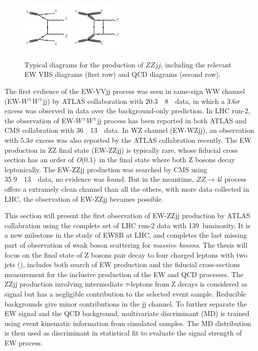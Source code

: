 \begin{figure}[!htbp]
\begin{center}
\includegraphics[width=0.22\textwidth]{figures/VBSZZ/diagram-QCDZZjj-gg.pdf}
\includegraphics[width=0.22\textwidth]{figures/VBSZZ/diagram-QCDZZjj-box.pdf}\\
\end{center}
\caption{Typical diagrams for the production of $ZZjj$, including the relevant EW VBS diagrams (first row) and QCD diagrams (second row).}
\label{fig:vbszz_diagrams}
\end{figure}

The first evdience of the EW-VVjj process was seen in same-sign WW channel (EW-$W^{\pm}W^{\pm}$jj) by ATLAS collaboration with 20.3~\ifb~8~\tev~data\cite{PhysRevLett.113.141803},
in which a 3.6$\sigma$ excess was observed in data over the background-only prediction.
In LHC run-2, the observation of EW-$W^{\pm}W^{\pm}$jj process has been reported in both ATLAS and CMS collabration with 36~\ifb~13~\tev~data\cite{PhysRevLett.123.161801, Sirunyan:2017ret}.
In WZ channel (EW-WZjj), an observation with 5.3$\sigma$ excess was also reported by the ATLAS collabration recently\cite{2019469}.
The EW production in ZZ final state (EW-ZZjj) is typically rare, whose fiducial cross section has an order of \textit{O}(0.1)~\ifb in the final state where both Z bosons decay leptonically.
The EW-ZZjj production was searched by CMS using 35.9~\ifb~13~\tev~data, no evidence was found\cite{2017682}.
But in the meantime, $ZZ \rightarrow 4l$ process offers a extramely clean channel than all the others, with more data collected in LHC, the observation of EW-ZZjj becames possible.

This section will present the first observation of EW-ZZjj production by ATLAS collabration using the complete set of LHC run-2 data with 139~\ifb luminosity.
It is a new milestone in the study of EWSB at LHC, and completes the last missing part of observation of weak boson scattering for \textit{massive bosons}.
The thesis will focus on the final state of Z bosons pair decay to four charged leptons with two jets (\lllljj), includes both search of EW production and the fiducial cross-sections measurement for the inclusive production of the EW and QCD processes.
The ZZjj production involving intermediate $\tau$-leptons from Z decays is considered as signal but has a negligible contribution to the selected event sample.
Reducible backgrounds give minor contributions in the \llll jj channel.
To further separate the EW signal and the QCD background, multivariate discriminant (MD) is trained using event kinematic information from simulated samples. 
The MD distribution is then used as discriminant in statistical fit to evaluate the signal strength of EW process.
